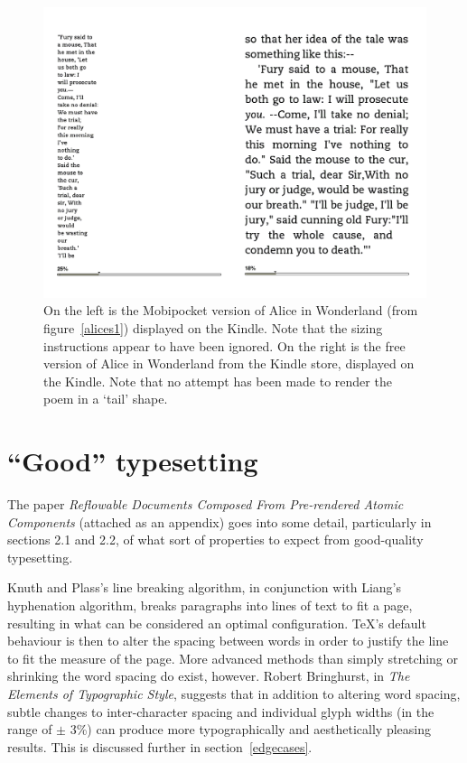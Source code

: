\begin{figure}[tb]
\begin{center}
\vspace{-.3in}
\includegraphics[width=\textwidth]{gfx/alices2}
\end{center}
\vspace{-.3in}
\caption[The same document displayed on the Kindle]{On
the left is the Mobipocket version of Alice in Wonderland (from figure~\ref{alices1}) displayed on
the Kindle. Note that the sizing instructions appear to have been ignored. On the right is the free
version of Alice in Wonderland from the Kindle store, displayed on the Kindle. Note that no attempt
has been made to render the poem in a `tail' shape.}
\label{alices2}
\end{figure}

\section{``Good'' typesetting}
\label{goodtypesetting}
The paper \emph{Reflowable Documents Composed From Pre-rendered Atomic Components}\cite{Pinkney2011}
(attached as an appendix) goes into some detail, particularly in sections 2.1 and 2.2, of what sort
of properties to expect from good-quality typesetting.

Knuth and Plass's line breaking algorithm\cite{Knuth1981}, in conjunction with Liang's hyphenation
algorithm\cite{Liang1983}, breaks paragraphs into lines of text to fit a page, resulting in what can be
considered an optimal configuration. \TeX 's default behaviour is then to alter the spacing
between words in order to justify the line to fit the measure of the page. More advanced methods
than simply stretching or shrinking the word spacing do exist, however. Robert Bringhurst, in
\emph{The Elements of Typographic Style}\cite{Bringhurst2008}, suggests that in addition to altering
word spacing, subtle changes to inter-character spacing and individual glyph widths (in the range of
$\pm$ 3\%) can produce more typographically and aesthetically pleasing results. This is discussed
further in section~\ref{edgecases}.




